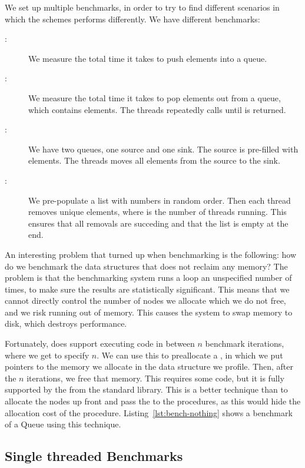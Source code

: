 \documentclass[b5paper]{report}
\begin{document}
We set up multiple benchmarks, in order to try to find different scenarios in
which the schemes performs differently. We have \todo{} different benchmarks:
\begin{description}
  \item[:] We measure the total time it takes to push 
    elements into a queue.
  \item[:] We measure the total time it takes to pop 
    elements out from a queue, which contains  elements. The threads
    repeatedly calls  until  is returned.
  \item[:] We have two queues, one source and one sink. The
    source is pre-filled with  elements. The threads moves all elements
    from the source to the sink.
  \item[:] We pre-populate a list with  numbers in
    random order. Then each thread removes  unique elements, where
     is the number of threads running. This ensures that all removals
    are succeding and that the list is empty at the end.
\end{description}

An interesting problem that turned up when benchmarking is the following: how do
we benchmark the data structures that does not reclaim any memory? The problem
is that the benchmarking system runs a loop an unspecified number of times, to
make sure the results are statistically significant. This means that we cannot directly control the number of nodes
we allocate which we do not free, and we risk running out of memory. This causes
the system to swap memory to disk, which destroys performance.

Fortunately,  does support executing code in between $n$ benchmark
iterations, where we get to specify $n$. We can use this to preallocate a
, in which we put pointers to the memory we allocate in the data
structure we profile. Then, after the $n$ iterations, we free that memory. This
requires some  code, but it is fully supported by the 
from the standard library. This is a better technique than to allocate the nodes
up front and pass the  to the procedures, as this would hide the
allocation cost of the procedure. Listing~\ref{lst:bench-nothing} shows a
benchmark of a Queue using this technique.

\subsection{Single threaded Benchmarks}
\end{document}
